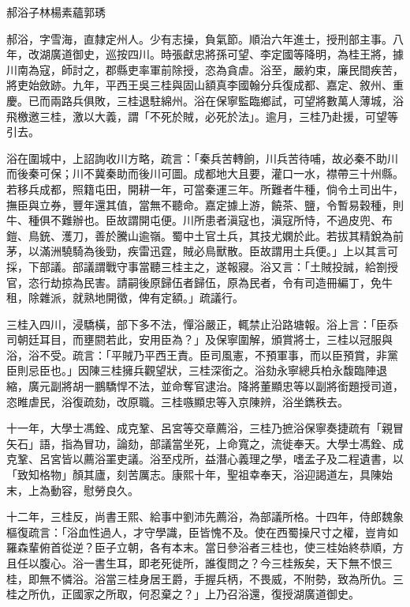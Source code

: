 
\begin{pinyinscope}
郝浴子林楊素蘊郭琇

郝浴，字雪海，直隸定州人。少有志操，負氣節。順治六年進士，授刑部主事。八年，改湖廣道御史，巡按四川。時張獻忠將孫可望、李定國等降明，為桂王將，據川南為寇，師討之，郡縣吏率軍前除授，恣為貪虐。浴至，嚴約束，廉民間疾苦，將吏始斂跡。九年，平西王吳三桂與固山額真李國翰分兵復成都、嘉定、敘州、重慶。已而兩路兵俱敗，三桂退駐綿州。浴在保寧監臨鄉試，可望將數萬人薄城，浴飛檄邀三桂，激以大義，謂「不死於賊，必死於法」。逾月，三桂乃赴援，可望等引去。

浴在圍城中，上詔詢收川方略，疏言：「秦兵苦轉餉，川兵苦待哺，故必秦不助川而後秦可保；川不冀秦助而後川可圖。成都地大且要，灌口一水，襟帶三十州縣。若移兵成都，照籍屯田，開耕一年，可當秦運三年。所難者牛種，倘令土司出牛，撫臣與立券，豐年還其值，當無不聽命。嘉定據上游，饒茶、鹽，令暫易穀種，則牛、種俱不難辦也。臣故謂開屯便。川所患者滇寇也，滇寇所恃，不過皮兜、布鎧、鳥銃、濩刀，善於騰山逾嶺。蜀中土官土兵，其技尤嫻於此。若拔其精銳為前茅，以滿洲驍騎為後勁，疾雷迅霆，賊必鳥獸散。臣故謂用土兵便。」上以其言可採，下部議。部議謂戰守事當聽三桂主之，遂報寢。浴又言：「土賊投誠，給劄授官，恣行劫掠為民害。請嗣後原歸伍者歸伍，原為民者，令有司造冊編丁，免牛租，除雜派，就熟地開徵，俾有定額。」疏議行。

三桂入四川，浸驕橫，部下多不法，憚浴嚴正，輒禁止沿路塘報。浴上言：「臣忝司朝廷耳目，而壅閼若此，安用臣為？」及保寧圍解，頒賞將士，三桂以冠服與浴，浴不受。疏言：「平賊乃平西王責。臣司風憲，不預軍事，而以臣預賞，非黨臣則忌臣也。」因陳三桂擁兵觀望狀，三桂深銜之。浴劾永寧總兵柏永馥臨陣退縮，廣元副將胡一鵬驕悍不法，並命奪官逮治。降將董顯忠等以副將銜題授司道，恣睢虐民，浴復疏劾，改原職。三桂嗾顯忠等入京陳辨，浴坐鐫秩去。

十一年，大學士馮銓、成克鞏、呂宮等交章薦浴，三桂乃摭浴保寧奏捷疏有「親冒矢石」語，指為冒功，論劾，部議當坐死，上命寬之，流徙奉天。大學士馮銓、成克鞏、呂宮皆以薦浴罣吏議。浴至戍所，益潛心義理之學，嗜孟子及二程遺書，以「致知格物」顏其廬，刻苦厲志。康熙十年，聖祖幸奉天，浴迎謁道左，具陳始末，上為動容，慰勞良久。

十二年，三桂反，尚書王熙、給事中劉沛先薦浴，為部議所格。十四年，侍郎魏象樞復疏言：「浴血性過人，才守學識，臣皆愧不及。使在西蜀操尺寸之權，豈肯如羅森輩俯首從逆？臣子立朝，各有本末。當日參浴者三桂也，使三桂始終恭順，方且任以腹心。浴一書生耳，即老死徙所，誰復問之？今三桂叛矣，天下無不恨三桂，即無不憐浴。浴當三桂身居王爵，手握兵柄，不畏威，不附勢，致為所仇。三桂之所仇，正國家之所取，何忍棄之？」上乃召浴還，復授湖廣道御史。


\end{pinyinscope}
